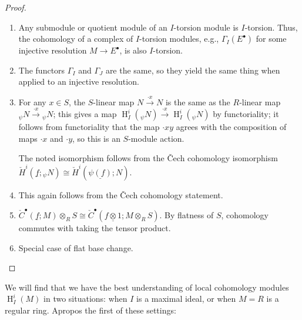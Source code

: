 \documentclass[11pt]{book}
\numberwithin{equation}{section}
\numberwithin{theorem}{chapter}
\theoremstyle{definition}
\newtheorem*{basic properties}{Basic Properties}
\newtheorem*{Important Remark}{Important Remark}
\theoremstyle{remark}
\renewcommand{\H}{\operatorname{H}}
\begin{document}
\begin{proof}
	\begin{enumerate}
		\item Any submodule or quotient module of an $I$-torsion module is $I$-torsion. Thus, the cohomology of a complex of $I$-torsion modules, e.g., $\Gamma_I(E^\bullet)$ for some injective resolution $M\to E^\bullet$, is also $I$-torsion.
		\item The functors $\Gamma_I$ and $\Gamma_J$ are the same, so they yield the same thing when applied to an injective resolution.
		\item For any $x\in S$, the $S$-linear map $N\stackrel{\cdot x}{\longrightarrow} N$ is the same as the $R$-linear map $_\psi N\stackrel{\cdot x}{\longrightarrow} {_\psi N}$; this gives a map $\H^i_I(_\psi N) \stackrel{\cdot x}{\longrightarrow} \H^i_I(_\psi N)$ by functoriality; it follows from functoriality that the map $\cdot xy$ agrees with the composition of maps $\cdot x$ and $\cdot y$, so this is an $S$-module action.
		
		The noted isomorphism follows from the \v{C}ech cohomology isomorphism $\check{H}^i({\underline{f}};{ _\psi N})\cong \check{H}^i(\underline{\psi(f)};N)$.
		
		\item This again follows from the \v{C}ech cohomology statement.
		
		\item $\check{C}^\bullet (\underline{f};M) \otimes_R S \cong \check{C}^\bullet (\underline{f\otimes 1};M \otimes_R S)$. By flatness of $S$, cohomology commutes with taking the tensor product.
		
		\item Special case of flat base change.
	\end{enumerate}
\end{proof}

We will find that we have the best understanding of local cohomology modules $\H^i_I(M)$ in two situations: when $I$ is a maximal ideal, or when $M=R$ is a regular ring. Apropos the first of these settings:
\end{document}
